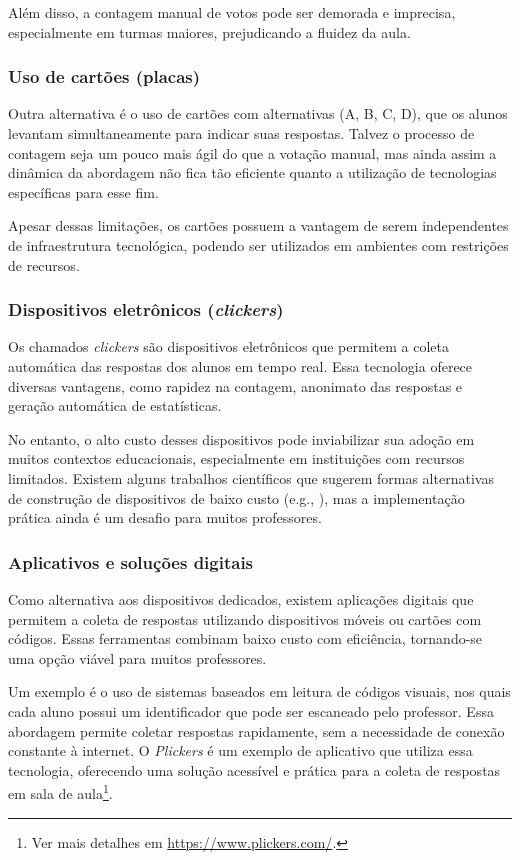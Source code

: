 Além disso, a contagem manual de votos pode ser demorada e imprecisa, especialmente em turmas maiores, prejudicando a fluidez da aula.

\subsubsection{Uso de cartões (placas)}

Outra alternativa é o uso de cartões com alternativas (A, B, C, D), que os alunos levantam simultaneamente para indicar suas respostas. Talvez o processo de contagem seja um pouco mais ágil do que a votação manual, mas ainda assim a dinâmica da abordagem não fica tão eficiente quanto a utilização de tecnologias específicas para esse fim. 

Apesar dessas limitações, os cartões possuem a vantagem de serem independentes de infraestrutura tecnológica, podendo ser utilizados em ambientes com restrições de recursos.

\subsubsection{Dispositivos eletrônicos ({\it clickers})}

Os chamados \textit{clickers} são dispositivos eletrônicos que permitem a coleta automática das respostas dos alunos em tempo real. Essa tecnologia oferece diversas vantagens, como rapidez na contagem, anonimato das respostas e geração automática de estatísticas.

No entanto, o alto custo desses dispositivos pode inviabilizar sua adoção em muitos contextos educacionais, especialmente em instituições com recursos limitados. Existem alguns trabalhos científicos que sugerem formas alternativas de construção de dispositivos de baixo custo (e.g., \cite{oliveira:2020}), mas a implementação prática ainda é um desafio para muitos professores.

\subsubsection{Aplicativos e soluções digitais}

Como alternativa aos dispositivos dedicados, existem aplicações digitais que permitem a coleta de respostas utilizando dispositivos móveis ou cartões com códigos. Essas ferramentas combinam baixo custo com eficiência, tornando-se uma opção viável para muitos professores.

Um exemplo é o uso de sistemas baseados em leitura de códigos visuais, nos quais cada aluno possui um identificador que pode ser escaneado pelo professor. Essa abordagem permite coletar respostas rapidamente, sem a necessidade de conexão constante à internet. O {\it Plickers} é um exemplo de aplicativo que utiliza essa tecnologia, oferecendo uma solução acessível e prática para a coleta de respostas em sala de aula\footnote{Ver mais detalhes em \url{https://www.plickers.com/}.}.

